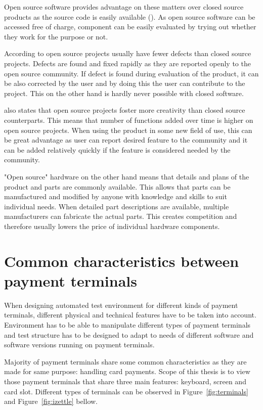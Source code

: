Open source software provides advantage on these matters over closed source products as the source code is easily available (\emph{\cite{morgan2007benefits}}). As open source software can be accessed free of charge, component can be easily evaluated by trying out whether they work for the purpose or not.

According to \emph{\cite{paulson2004empirical}} open source projects usually have fewer defects than closed source projects. Defects are found and fixed rapidly as they are reported openly to the open source community. If defect is found during evaluation of the product, it can be also corrected by the user and by doing this the user can contribute to the project. This on the other hand is hardly never possible with closed software.

\emph{\cite{paulson2004empirical}} also states that open source projects foster more creativity than closed source counterparts. This means that number of functions added over time is higher on open source projects. When using the product in some new field of use, this can be great advantage as user can report desired feature to the community and it can be added relatively quickly if the feature is considered needed by the community.

"Open source" hardware on the other hand means that details and plans of the product and parts are commonly available. This allows that parts can be manufactured and modified by anyone with knowledge and skills to suit individual needs. When detailed part descriptions are available, multiple manufacturers can fabricate the actual parts. This creates competition and therefore usually lowers the price of individual hardware components.

\section{Common characteristics between payment terminals}

When designing automated test environment for different kinds of payment terminals, different physical and technical features have to be taken into account. Environment has to be able to manipulate different types of payment terminals and test structure has to be designed to adapt to needs of different software and software versions running on payment terminals.

Majority of payment terminals share some common characteristics as they are made for same purpose: handling card payments. Scope of this thesis is to view those payment terminals that share three main features: keyboard, screen and card slot. Different types of terminals can be observed in Figure~\ref{fig:terminals} and Figure~\ref{fig:izettle} bellow.

